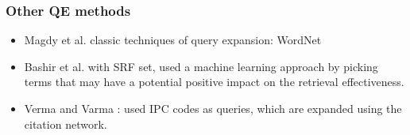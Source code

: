 \documentclass[xcolor=x11names,compress]{beamer}
\renewcommand{\(}{\begin{columns}}
\renewcommand{\)}{\end{columns}}
\newcommand{\<}[1]{\begin{column}{#1}}
\renewcommand{\>}{\end{column}}
\begin{document}
\begin{frame}
\frametitle{Other QE methods}

\begin{itemize}
\item Magdy et al. \cite{Magdy2011} classic techniques of query expansion: WordNet
\item Bashir et al. \cite{Bashir2010} with SRF set, used a machine learning approach by picking terms that may have a potential positive impact on the retrieval effectiveness. 


\item Verma and Varma \cite{Verma2011}: used IPC codes as queries, which are expanded using the citation network. 
\end{itemize}

\end{frame}
\end{document}
